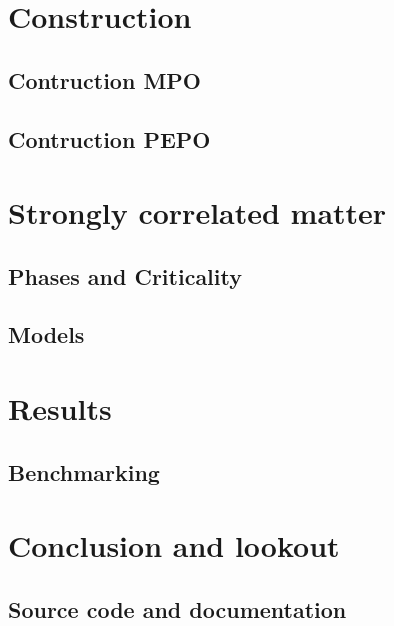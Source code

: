 \documentclass{book}
\begin{document}
\chapter{Construction}

\section{Contruction MPO}


\section{Contruction PEPO}


\chapter{Strongly correlated matter}

\section{Phases and Criticality} \label{sec:PhasesAndCrit}


\section{Models}


\chapter{Results}

\section{Benchmarking}


\chapter{Conclusion and lookout}

\begin{appendices}
    \chapter{Source code and documentation}
\end{appendices}



\end{document}
